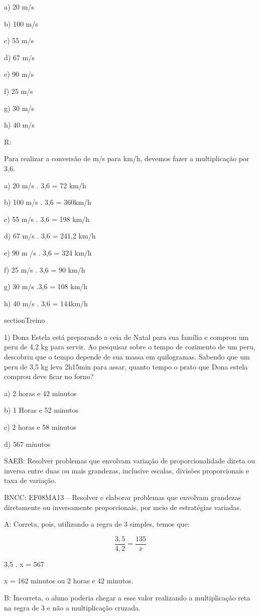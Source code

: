 a) 20 m/s

b) 100 m/s

c) 55 m/s

d) 67 m/s

e) 90 m/s

f) 25 m/s

g) 30 m/s

h) 40 m/s

R:

Para realizar a conversão de m/s para km/h, devemos fazer a
multiplicação por 3,6.

a) 20 m/s . 3,6 = 72 km/h

b) 100 m/s . 3,6 = 360km/h

c) 55 m/s . 3,6 = 198 km/h

d) 67 m/s . 3,6 = 241,2 km/h

e) 90 m /s . 3,6 = 324 km/h

f) 25 m/s . 3,6 = 90 km/h

g) 30 m/s .3,6 = 108 km/h

h) 40 m/s . 3,6 = 144km/h

section{Treino}

1) Dona Estela está preparando a ceia de Natal para sua família e
comprou um peru de 4,2 kg para servir. Ao pesquisar sobre o tempo de
cozimento de um peru, descobriu que o tempo depende de sua massa em
quilogramas. Sabendo que um peru de 3,5 kg leva 2h15min para assar,
quanto tempo o prato que Dona estela comprou deve ficar no forno?

a) 2 horas e 42 minutos

b) 1 Horas e 52 minutos

c) 2 horas e 58 minutos

d) 567 minutos

SAEB: Resolver problemas que envolvam variação de proporcionalidade
direta ou inversa entre duas ou mais grandezas, inclusive escalas,
divisões proporcionais e taxa de variação.

BNCC: EF08MA13 -- Resolver e elaborar problemas que envolvam grandezas
diretamente ou inversamente proporcionais, por meio de estratégias
variadas.

A: Correta, pois, utilizando a regra de 3 simples, temos que:

\[\frac {3,5}{4,2} = \frac{135}{x}\]

3,5 . x = 567

x = 162 minutos ou 2 horas e 42 minutos.

B: Incorreta, o aluno poderia chegar a esse valor realizando a
multiplicação reta na regra de 3 e não a multiplicação cruzada.

